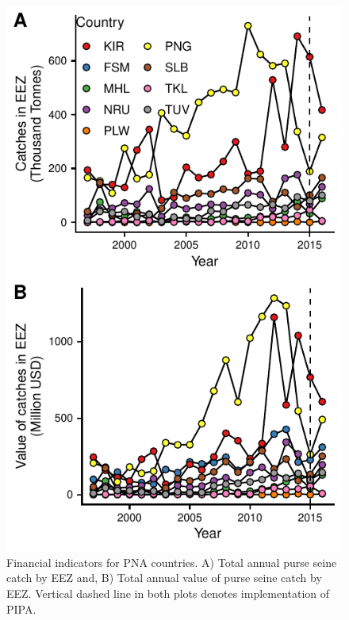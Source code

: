 \documentclass[12pt]{article}
\begin{document}
\begin{figure}
\centering
	\includegraphics{img/catches.pdf}
	\caption{\label{fig:catches}Financial indicators for PNA countries. A) Total annual purse seine catch by EEZ and, B) Total annual value of purse seine catch by EEZ. Vertical dashed line in both plots denotes implementation of PIPA.}
\end{figure}

\clearpage



\end{document}

